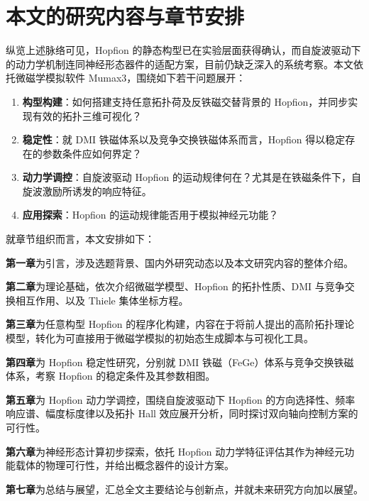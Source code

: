 \section{本文的研究内容与章节安排}

纵览上述脉络可见，Hopfion 的静态构型已在实验层面获得确认，而自旋波驱动下的动力学机制连同神经形态器件的适配方案，目前仍缺乏深入的系统考察。本文依托微磁学模拟软件 Mumax3，围绕如下若干问题展开：

\begin{enumerate}[label=(\arabic*)]
  \item \textbf{构型构建}：如何搭建支持任意拓扑荷及反铁磁交替背景的 Hopfion，并同步实现有效的拓扑三维可视化？
  \item \textbf{稳定性}：就 DMI 铁磁体系以及竞争交换铁磁体系而言，Hopfion 得以稳定存在的参数条件应如何界定？
  \item \textbf{动力学调控}：自旋波驱动 Hopfion 的运动规律何在？尤其是在铁磁条件下，自旋波激励所诱发的响应特征。
  \item \textbf{应用探索}：Hopfion 的运动规律能否用于模拟神经元功能？
\end{enumerate}

就章节组织而言，本文安排如下：

\textbf{第一章}为引言，涉及选题背景、国内外研究动态以及本文研究内容的整体介绍。

\textbf{第二章}为理论基础，依次介绍微磁学模型、Hopfion 的拓扑性质、DMI 与竞争交换相互作用、以及 Thiele 集体坐标方程。

\textbf{第三章}为任意构型 Hopfion 的程序化构建，内容在于将前人提出的高阶拓扑理论模型，转化为可直接用于微磁学模拟的初始态生成脚本与可视化工具。

\textbf{第四章}为 Hopfion 稳定性研究，分别就 DMI 铁磁（FeGe）体系与竞争交换铁磁体系，考察 Hopfion 的稳定条件及其参数相图。

\textbf{第五章}为 Hopfion 动力学调控，围绕自旋波驱动下 Hopfion 的方向选择性、频率响应谱、幅度标度律以及拓扑 Hall 效应展开分析，同时探讨双向轴向控制方案的可行性。

\textbf{第六章}为神经形态计算初步探索，依托 Hopfion 动力学特征评估其作为神经元功能载体的物理可行性，并给出概念器件的设计方案。

\textbf{第七章}为总结与展望，汇总全文主要结论与创新点，并就未来研究方向加以展望。
